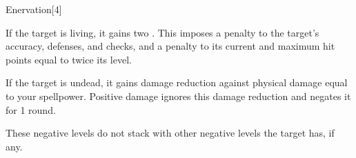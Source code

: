 \begin{spellsection}{Enervation}[4]
    \begin{spellheader}
    \end{spellheader}
    \begin{spellcontent}
        \begin{spelltargetinginfo}
        \end{spelltargetinginfo}
        \begin{spelleffects}
            \spelleffect If the target is living, it gains two . This imposes a  penalty to the target's accuracy, defenses, and checks, and a penalty to its current and maximum hit points equal to twice its level.

            If the target is undead, it gains damage reduction against physical damage equal to your spellpower. Positive damage ignores this damage reduction and negates it for 1 round.
        \end{spelleffects}
    \end{spellcontent}
    \begin{spellfooter}
        \spellnotes These negative levels do not stack with other negative levels the target has, if any.
        \miscastrandom
    \end{spellfooter}
    \begin{spellaugments}
    \end{spellaugments}
\end{spellsection}

